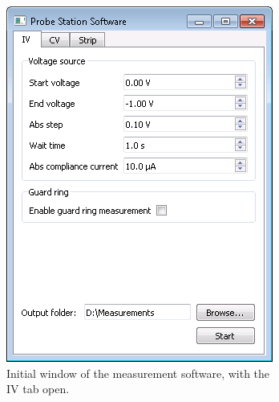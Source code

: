 \documentclass[a4paper]{article}
\begin{document}
\begin{figure}[hbtp]
\centering
\begin{subfigure}[t]{0.475\textwidth}
\centering\captionsetup{width=.8\linewidth}%
\includegraphics[width=\linewidth]{pictures/softiv.png}
\caption[Software with the IV Tab]{Initial window of the measurement software, with the IV tab open.}
\label{fig:softwareopeniv}
\end{subfigure}
\begin{subfigure}[t]{0.475\textwidth}
\centering\captionsetup{width=.8\linewidth}%

\end{subfigure}
\end{figure}
\end{document}
